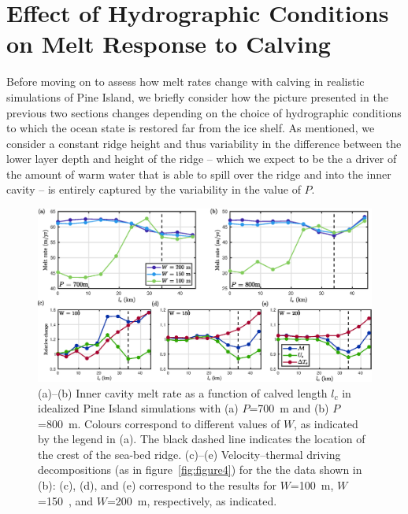 \documentclass[draft]{agujournal2019}
\begin{document}
\section{Effect of Hydrographic Conditions on Melt Response to Calving}\label{S:Results:P}
Before moving on to assess how melt rates change with calving in realistic simulations of Pine Island, we briefly consider how the picture presented in the previous two sections changes depending on the choice of hydrographic conditions to which the ocean state is restored far from the ice shelf. As mentioned, we consider a constant ridge height and thus variability in the difference between the lower layer depth and height of the ridge -- which we expect to be the a driver of the amount of warm water that is able to spill over the ridge and into the inner cavity -- is entirely captured by the variability in the value of $P$.

\begin{figure}
    \centering
    \includegraphics[width = \textwidth]{../make_figures/plots/figure8.eps}
    \caption{(a)--(b) Inner cavity melt rate as a function of calved length $l_c$ in idealized Pine Island simulations with (a) $P$=700~m and (b) $P$=800~m. Colours correspond to different values of $W$, as indicated by the legend in (a). The black dashed line indicates the location of the crest of the sea-bed ridge. (c)--(e) Velocity--thermal driving decompositions (as in figure~\ref{fig:figure4}) for the the data shown in (b): (c), (d), and (e) correspond to the results for $W$=100~m, $W$=150~, and $W$=200~m, respectively, as indicated. }
    \label{fig:figure8}
\end{figure}
\end{document}
